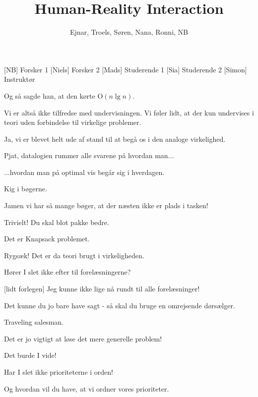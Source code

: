 \documentclass[a4paper,11pt]{article}
\title{Human-Reality Interaction}
\author{Ejnar, Troels, Søren, Nana, Ronni, NB}
\begin{document}
\maketitle

\begin{roles}
    [NB] Forsker 1
    [Niels] Forsker 2
    [Mads] Studerende 1
    [Sia] Studerende 2
    [Simon] Instruktør
\end{roles}

\begin{sketch}


   Og så sagde han, at den kørte O$(n \lg n)$.


   Vi er altså ikke tilfredse med undervisningen. Vi føler
  lidt, at der kun undervises i teori uden forbindelse til virkelige
  problemer.

   Ja, vi er blevet helt ude af stand til at begå os i den
  analoge virkelighed.

   Pjat, datalogien rummer alle svarene på hvordan man...

   ...hvordan man på optimal vis begår sig i hverdagen.

   Kig i bøgerne.

   Jamen vi har så mange bøger, at der næsten ikke er plads i
  tasken!

   Trivielt! Du skal blot pakke bedre.

   Det er Knapsack problemet.

   Rygsæk! Det er da teori brugt i virkeligheden.

   Hører I slet ikke efter til forelæsningerne?

  [lidt forlegen] Jeg kunne ikke lige nå rundt til alle
  forelæsninger!

   Det kunne du jo bare have sagt - så skal du bruge en
  omrejsende dørsælger.

   Traveling salesman.

   Det er jo vigtigt at løse det mere generelle problem!

   Det burde I vide!

   Har I slet ikke prioriteterne i orden!

   Og hvordan vil du have, at vi ordner vores prioriteter.


\end{sketch}
\end{document}
